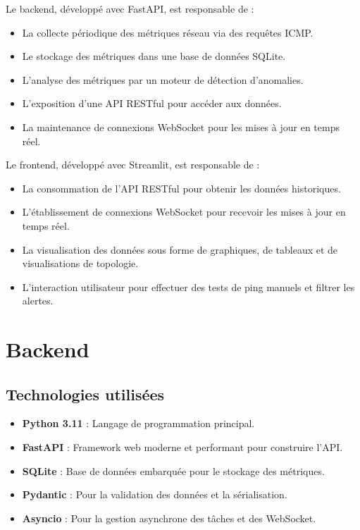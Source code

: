 \documentclass[12pt,a4paper]{report}
\begin{document}
Le backend, développé avec FastAPI, est responsable de :
\begin{itemize}
    \item La collecte périodique des métriques réseau via des requêtes ICMP.
    \item Le stockage des métriques dans une base de données SQLite.
    \item L'analyse des métriques par un moteur de détection d'anomalies.
    \item L'exposition d'une API RESTful pour accéder aux données.
    \item La maintenance de connexions WebSocket pour les mises à jour en temps réel.
\end{itemize}

Le frontend, développé avec Streamlit, est responsable de :
\begin{itemize}
    \item La consommation de l'API RESTful pour obtenir les données historiques.
    \item L'établissement de connexions WebSocket pour recevoir les mises à jour en temps réel.
    \item La visualisation des données sous forme de graphiques, de tableaux et de visualisations de topologie.
    \item L'interaction utilisateur pour effectuer des tests de ping manuels et filtrer les alertes.
\end{itemize}

\section{Backend}
\subsection{Technologies utilisées}
\begin{itemize}
    \item \textbf{Python 3.11} : Langage de programmation principal.
    \item \textbf{FastAPI} : Framework web moderne et performant pour construire l'API.
    \item \textbf{SQLite} : Base de données embarquée pour le stockage des métriques.
    \item \textbf{Pydantic} : Pour la validation des données et la sérialisation.
    \item \textbf{Asyncio} : Pour la gestion asynchrone des tâches et des WebSocket.
\end{itemize}
\end{document}
